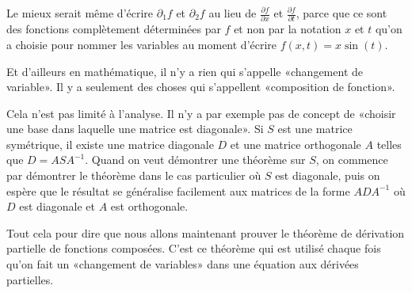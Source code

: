 Le mieux serait même d'écrire \( \partial_1f\) et \( \partial_2f\) au lieu de \( \frac{ \partial f }{ \partial x }\) et \( \frac{ \partial f }{ \partial t }\), parce que ce sont des fonctions complètement déterminées par \( f\) et non par la notation \( x\) et \( t\) qu'on a choisie pour nommer les variables au moment d'écrire \( f(x,t)=x\sin(t)\).

\begin{normaltext}
    Et d'ailleurs en mathématique, il n'y a rien qui s'appelle «changement de variable». Il y a seulement des choses qui s'appellent «composition de fonction».

    Cela n'est pas limité à l'analyse. Il n'y a par exemple pas de concept de «choisir une base dans laquelle une matrice est diagonale». Si \(S\) est une matrice symétrique, il existe une matrice diagonale \( D\) et une matrice orthogonale \( A \) telles que \( D=ASA^{-1}\). Quand on veut démontrer une théorème sur \( S\), on commence par démontrer le théorème dans le cas particulier où \( S\) est diagonale, puis on espère que le résultat se généralise facilement aux matrices de la forme \( ADA^{-1}\) où \( D\) est diagonale et \( A\) est orthogonale.
\end{normaltext}

\begin{normaltext}
    Tout cela pour dire que nous allons maintenant prouver le théorème de dérivation partielle de fonctions composées. C'est ce théorème qui est utilisé chaque fois qu'on fait un «changement de variables» dans une équation aux dérivées partielles.
\end{normaltext}

